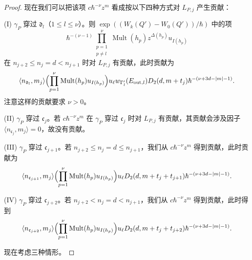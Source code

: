 \begin{proof}

现在我们可以把该项 $c\hbar^{-\nu}z^m$ 看成按以下四种方式对 $L_{P,j}$ 产生贡献：

(I) $\gamma_P$ 穿过 $\mathfrak d_l$（$1\le l\le\nu$）。则 $\exp((W_k(Q')-W_0(Q'))/\hbar)$ 中的项
\[
  \hbar^{-(\nu-1)}\prod_{\substack{p=1\\ p\ne l}}^{\nu}\operatorname{Mult}(h_p)z^{\Delta(h_p)}u_{I(h_p)}
\]
在 $n_{j+2}\le n_j=d<n_{j+1}$ 时对 $L_{P,j}$ 有贡献，此时贡献为
\[
  \langle n_{\mathfrak d_l},m_j\rangle\Bigl(\prod_{p=1}^{\nu}\operatorname{Mult}(h_p)u_{I(h_p)}\Bigr)
  u_\ell w_{\Gamma'_l}(E_{\mathrm{out},l})D_2(d,m+t_j)\hbar^{-(\nu+3d-|m|-1)}.
\]
注意这样的贡献要求 $\nu>0$。

(II) $\gamma_P$ 穿过 $\mathfrak c_j$。若 $c\hbar^{-\nu}z^m$ 在 $\gamma_P$ 穿过 $\mathfrak c_j$ 时对 $L_{P,j}$ 有贡献，其贡献会涉及因子 $\langle n_{\mathfrak c_j},m_j\rangle=0$，故没有贡献。

(III) $\gamma_P$ 穿过 $\mathfrak c_{j+1}$。若 $n_{j+2}\le n_j=d\le n_{j+1}$，我们从 $c\hbar^{-\nu}z^m$ 得到贡献，此时贡献为
\[
  \langle n_{\mathfrak c_{j+1}},m_j\rangle\Bigl(\prod_{p=1}^{\nu}\operatorname{Mult}(h_p)u_{I(h_p)}\Bigr)
  u_\ell D_2(d,m+t_j+t_{j+1})\hbar^{-(\nu+3d-|m|-1)}.
\]

(IV) $\gamma_P$ 穿过 $\mathfrak c_{j+2}$。若 $n_{j+2}<n_j=d<n_{j+1}$，我们从 $c\hbar^{-\nu}z^m$ 得到贡献，此时得到
\[
  \langle n_{\mathfrak c_{j+2}},m_j\rangle\Bigl(\prod_{p=1}^{\nu}\operatorname{Mult}(h_p)u_{I(h_p)}\Bigr)
  u_\ell D_2(d,m+t_j+t_{j+2})\hbar^{-(\nu+3d-|m|-1)}.
\]

现在考虑三种情形。


\end{proof}
